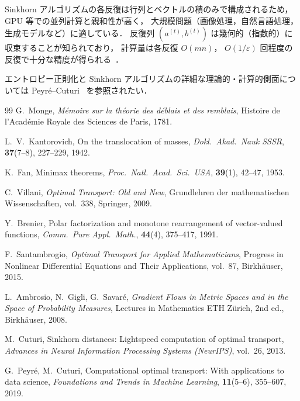 \documentclass[uplatex, dvipdfmx]{jsarticle}
\begin{document}
Sinkhorn アルゴリズムの各反復は行列とベクトルの積のみで構成されるため，
GPU 等での並列計算と親和性が高く，
大規模問題（画像処理，自然言語処理，生成モデルなど）に適している．
反復列 $(a^{(t)},b^{(t)})$ は幾何的（指数的）に収束することが知られており，
計算量は各反復 $O(mn)$，
$O(1/\varepsilon)$ 回程度の反復で十分な精度が得られる~\cite{Cuturi2013}．

エントロピー正則化と Sinkhorn アルゴリズムの詳細な理論的・計算的側面については
Peyr\'{e}--Cuturi~\cite{PeyreCuturi2019} を参照されたい．

\begin{thebibliography}{99}
G.~Monge,
\textit{M\'{e}moire sur la th\'{e}orie des d\'{e}blais et des remblais},
Histoire de l'Acad\'{e}mie Royale des Sciences de Paris, 1781.

L.~V.~Kantorovich,
On the translocation of masses,
\textit{Dokl.\ Akad.\ Nauk SSSR}, \textbf{37}(7--8), 227--229, 1942.

K.~Fan,
Minimax theorems,
\textit{Proc.\ Natl.\ Acad.\ Sci.\ USA}, \textbf{39}(1), 42--47, 1953.

C.~Villani,
\textit{Optimal Transport: Old and New},
Grundlehren der mathematischen Wissenschaften, vol.~338,
Springer, 2009.

Y.~Brenier,
Polar factorization and monotone rearrangement of vector-valued functions,
\textit{Comm.\ Pure Appl.\ Math.}, \textbf{44}(4), 375--417, 1991.

F.~Santambrogio,
\textit{Optimal Transport for Applied Mathematicians},
Progress in Nonlinear Differential Equations and Their Applications, vol.~87,
Birkh\"{a}user, 2015.

L.~Ambrosio, N.~Gigli, G.~Savar\'{e},
\textit{Gradient Flows in Metric Spaces and in the Space of Probability Measures},
Lectures in Mathematics ETH Z\"{u}rich, 2nd ed., Birkh\"{a}user, 2008.

M.~Cuturi,
Sinkhorn distances: Lightspeed computation of optimal transport,
\textit{Advances in Neural Information Processing Systems (NeurIPS)}, vol.~26, 2013.

G.~Peyr\'{e}, M.~Cuturi,
Computational optimal transport: With applications to data science,
\textit{Foundations and Trends in Machine Learning},
\textbf{11}(5--6), 355--607, 2019.
\end{thebibliography}
\end{document}
